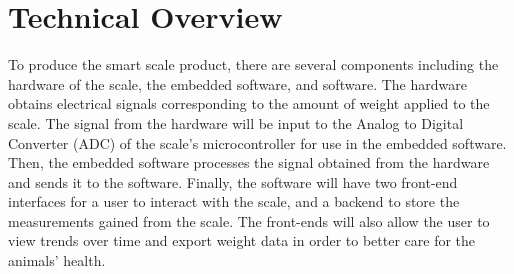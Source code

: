 
\chapter{Technical Overview}

To produce the smart scale product, there are several components including the hardware of the scale, the embedded software, and software. The hardware obtains electrical signals corresponding to the amount of weight applied to the scale. The signal from the hardware will be input to the Analog to Digital Converter (ADC) of the scale’s microcontroller for use in the embedded software. Then, the embedded software processes the signal obtained from the hardware and sends it to the software. Finally, the software will have two front-end interfaces for a user to interact with the scale, and a backend to store the measurements gained from the scale. The front-ends will also allow the user to view trends over time and export weight data in order to better care for the animals’ health.